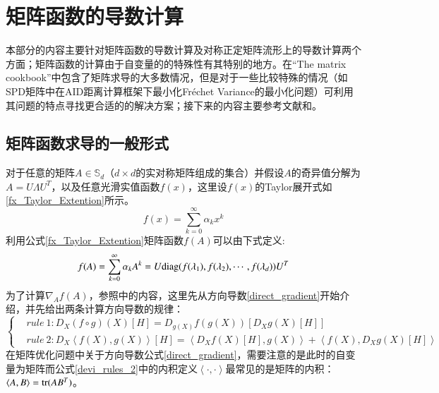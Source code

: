 \section{矩阵函数的导数计算}
本部分的内容主要针对矩阵函数的导数计算及对称正定矩阵流形上的导数计算两个方面；矩阵函数的计算由于自变量的的特殊性有其特别的地方。在“The matrix cookbook”\cite{Matrix_CookBook}中包含了矩阵求导的大多数情况，但是对于一些比较特殊的情况（如SPD矩阵中在AID距离计算框架下最小化Fr\'echet Variance的最小化问题）可利用其问题的特点寻找更合适的的解决方案；接下来的内容主要参考文献\cite{Maniopt_DiscreteCurveFitting}和\cite{Maniopt_book}。
\subsection{矩阵函数求导的一般形式}
\label{sec:matrix_func_devi}
对于任意的矩阵$A \in \mathbb{S}_{d}$（$d\times d$的实对称矩阵组成的集合）并假设$A$的奇异值分解为$A=U\Lambda U^{T}$，以及任意光滑实值函数$f(x)$，这里设$f(x)$的Taylor展开式如\ref{fx_Taylor_Extention}所示。
\begin{equation}
\label{fx_Taylor_Extention}
f(x)=\sum_{k=0}^{\infty}\alpha_{k}x^{k}
\end{equation}
利用公式\ref{fx_Taylor_Extention}矩阵函数$f(A)$可以由下式定义:
\begin{equation}
\label{Matrix_Function}
f(A)=\sum_{k=0}^{\infty}\alpha_{k}A^{k}=U{\rm diag}(f(\lambda_1),f(\lambda_2),\cdots,f(\lambda_{d}))U^{T}
\end{equation}
为了计算$\nabla_{A}f(A)$，参照\cite{Maniopt_DiscreteCurveFitting}中的内容，这里先从方向导数\ref{direct_gradient}开始介绍，并先给出两条计算方向导数的规律\cite{Maniopt_DiscreteCurveFitting}：
\begin{equation}
\label{devi_rules_2}
\left\{
\begin{split}
&rule~1:D_{X}(f\circ g)(X)[H]=D_{g(X)}f(g(X))[D_{X}g(X)[H]]\\
&rule~2:D_{X}\left<f(X),g(X)\right>[H]=\left<D_{X}f(X)[H],g(X)\right>+\left<f(X),D_{X}g(X)[H]\right>
\end{split}
\right.
\end{equation}
在矩阵优化问题中关于方向导数公式\ref{direct_gradient}，需要注意的是此时的自变量为矩阵而公式\ref{devi_rules_2}中的内积定义$\left<\cdot,\cdot\right>$最常见的是矩阵的内积：$\left<A,B\right>={\rm tr}(AB^{T})$。

